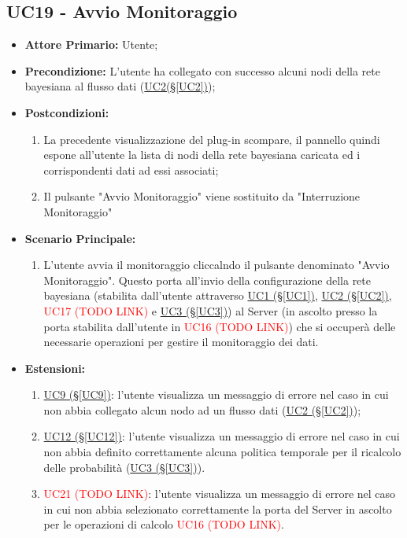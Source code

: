 \subsection{UC19 - Avvio Monitoraggio}\label{UC19}
\begin{itemize}
\item \textbf{Attore Primario:} Utente;
\item \textbf{Precondizione:} L'utente ha collegato con successo alcuni nodi della rete bayesiana al flusso dati (\hyperref[UC2]{UC2(§\ref*{UC2})});
\item \textbf{Postcondizioni:} 
	\begin{enumerate}
	\item La precedente visualizzazione del plug-in scompare, il pannello quindi espone all'utente la lista di nodi della rete bayesiana caricata ed i corrispondenti dati ad essi associati;
	\item Il pulsante "Avvio Monitoraggio" viene sostituito da "Interruzione Monitoraggio"
	\end{enumerate}
\item \textbf{Scenario Principale:}
	\begin{enumerate}
	\item L'utente avvia il monitoraggio cliccalndo il pulsante denominato "Avvio Monitoraggio". Questo porta all'invio della configurazione della rete bayesiana (stabilita dall'utente attraverso \hyperref[UC1]{UC1 (§\ref*{UC1})}, \hyperref[UC2]{UC2 (§\ref*{UC2})}, \textcolor{red}{UC17 (TODO LINK)} e \hyperref[UC3]{UC3 (§\ref*{UC3})}) al Server (in ascolto presso la porta stabilita dall'utente in \textcolor{red}{UC16 (TODO LINK)}) che si occuperà delle necessarie operazioni per gestire il monitoraggio dei dati.
	\end{enumerate}
\item \textbf{Estensioni:}
	\begin{enumerate}
	\item \hyperref[UC9]{UC9 (§\ref*{UC9})}: l'utente visualizza un messaggio di errore nel caso in cui non abbia collegato alcun nodo ad un flusso dati (\hyperref[UC2]{UC2 (§\ref*{UC2})});
	\item \hyperref[UC12]{UC12 (§\ref*{UC12})}: l'utente visualizza un messaggio di errore nel caso in cui non abbia definito correttamente alcuna politica temporale per il ricalcolo delle probabilità (\hyperref[UC3]{UC3 (§\ref*{UC3})}).
	\item \textcolor{red}{UC21 (TODO LINK)}: l'utente visualizza un messaggio di errore nel caso in cui non abbia selezionato correttamente la porta del Server in ascolto per le operazioni di calcolo \textcolor{red}{UC16 (TODO LINK)}.
	\end{enumerate}
\end{itemize}



